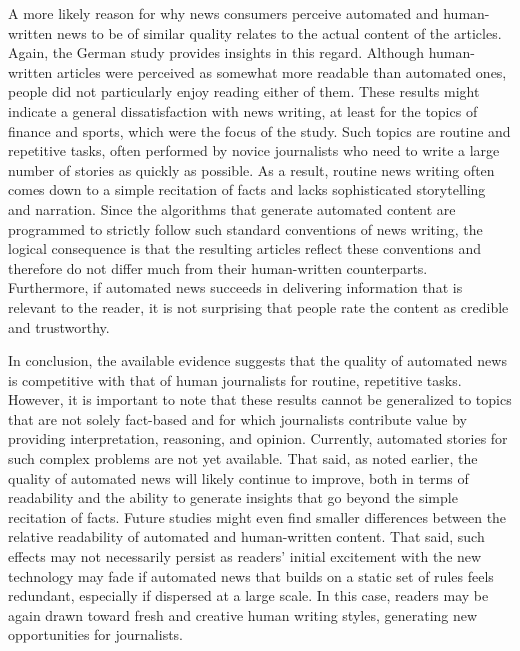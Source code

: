 \documentclass[notoc, symmetric, nobib, nols]{towcenter-book}
\begin{document}
A more likely reason for why news consumers perceive automated and human-written news to be of similar quality relates to the actual content of the articles. Again, the German study provides insights in this regard.\cite{graefe15} Although human-written articles were perceived as somewhat more readable than automated ones, people did not particularly enjoy reading either of them. These results might indicate a general dissatisfaction with news writing, at least for the topics of finance and sports, which were the focus of the study. Such topics are routine and repetitive tasks, often performed by novice journalists who need to write a large number of stories as quickly as possible. As a result, routine news writing often comes down to a simple recitation of facts and lacks sophisticated storytelling and narration. Since the algorithms that generate automated content are programmed to strictly follow such standard conventions of news writing, the logical consequence is that the resulting articles reflect these conventions and therefore do not differ much from their human-written counterparts. Furthermore, if automated news succeeds in delivering information that is relevant to the reader, it is not surprising that people rate the content as credible and trustworthy.

In conclusion, the available evidence suggests that the quality of automated news is competitive with that of human journalists for routine, repetitive tasks. However, it is important to note that these results cannot be generalized to topics that are not solely fact-based and for which journalists contribute value by providing interpretation, reasoning, and opinion. Currently, automated stories for such complex problems are not yet available. That said, as noted earlier, the quality of automated news will likely continue to improve, both in terms of readability and the ability to generate insights that go beyond the simple recitation of facts. Future studies might even find smaller differences between the relative readability of automated and human-written content. That said, such effects may not necessarily persist as readers’ initial excitement with the new technology may fade if automated news that builds on a static set of rules feels redundant, especially if dispersed at a large scale. In this case, readers may be again drawn toward fresh and creative human writing styles, generating new opportunities for journalists. 
\end{document}
